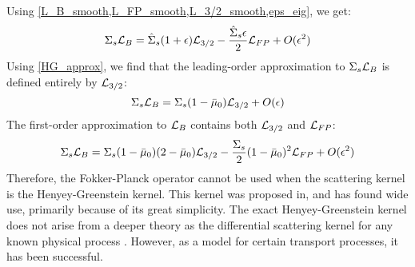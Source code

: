Using \cref{L_B_smooth,L_FP_smooth,L_3/2_smooth,eps_eig}, we get:
\begin{equation}
\Sigma_s\mc{L}_B = \hat{\Sigma}_s(1+\epsilon) \mc{L}_{3/2} -
\frac{\hat{\Sigma}_s \epsilon}{2} \mc{L}_{FP} + O(\epsilon^2)
\label{HG_approx}
\end{equation}
Using \cref{HG_approx}, we find that the leading-order approximation
to $\Sigma_s \mathcal{L}_B$ is defined entirely by $\mathcal{L}_{3/2}$:
\begin{equation}
\Sigma_s \mathcal{L}_B = \Sigma_s(1-\bar{\mu}_0) \mathcal{L}_{3/2} +O(\epsilon)
\end{equation}
The first-order approximation to $\mathcal{L}_B$ contains both $\mathcal{L}_{3/2}$ and
$\mathcal{L}_{FP}$:
\begin{equation}
\Sigma_s\mathcal{L}_B = \Sigma_s(1-\bar{\mu}_0)(2-\bar{\mu}_0) \mathcal{L}_{3/2} -
\frac{\Sigma_s}{2}(1-\bar{\mu}_0)^2\mathcal{L}_{FP} + O(\epsilon^2)
\end{equation}
Therefore, the Fokker-Planck operator cannot be used when the scattering
kernel is the Henyey-Greenstein kernel. This kernel was proposed in\cite{H-G}, 
and has found wide use, primarily because of its great simplicity. The exact 
Henyey-Greenstein kernel does not arise from a deeper theory as the differential 
scattering kernel for any known physical process \cite{larsen_fp}. However, as 
a model for certain transport processes, it has been successful.

